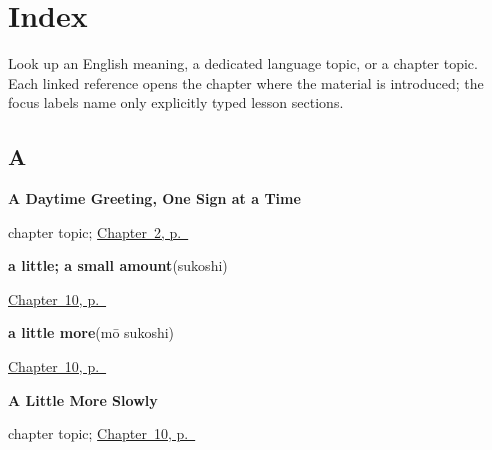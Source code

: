 
\chapter*{Index}

Look up an English meaning, a dedicated language topic, or a chapter topic. Each linked reference opens the chapter where the material is introduced; the focus labels name only explicitly typed lesson sections.

\section*{A}

\noindent\begin{minipage}[t]{\linewidth}
\raggedright
\textbf{A Daytime Greeting, One Sign at a Time}\par
\footnotesize chapter topic; \hyperref[ch:ja-daytime-greeting]{Chapter~2, p.~\pageref*{ch:ja-daytime-greeting}}
\end{minipage}\par\smallskip

\noindent\begin{minipage}[t]{\linewidth}
\raggedright
\textbf{a little; a small amount}\enspace\emph{}\enspace(sukoshi)\par
\footnotesize \hyperref[ch:ja-slower-please]{Chapter~10, p.~\pageref*{ch:ja-slower-please}}
\end{minipage}\par\smallskip

\noindent\begin{minipage}[t]{\linewidth}
\raggedright
\textbf{a little more}\enspace\emph{}\enspace(mō sukoshi)\par
\footnotesize \hyperref[ch:ja-slower-please]{Chapter~10, p.~\pageref*{ch:ja-slower-please}}
\end{minipage}\par\smallskip

\noindent\begin{minipage}[t]{\linewidth}
\raggedright
\textbf{A Little More Slowly}\par
\footnotesize chapter topic; \hyperref[ch:ja-slower-please]{Chapter~10, p.~\pageref*{ch:ja-slower-please}}
\end{minipage}\par\smallskip

